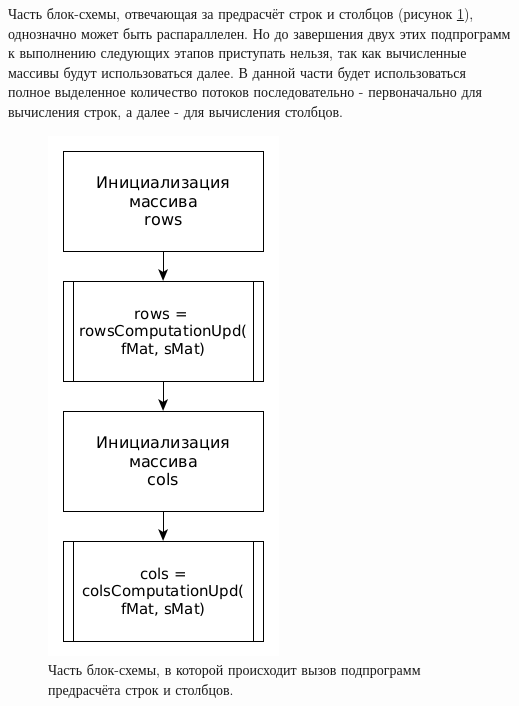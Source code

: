 \documentclass[12pt]{report}
\begin{document}
Часть блок-схемы, отвечающая за предрасчёт строк и столбцов (рисунок \ref{img:paralPart1}), однозначно может быть распараллелен. Но до завершения двух этих подпрограмм к выполнению следующих этапов приступать нельзя, так как вычисленные массивы будут использоваться далее. В данной части будет использоваться полное выделенное количество потоков последовательно - первоначально для вычисления строк, а далее - для вычисления столбцов.
\begin{figure}
\begin{center}
\includegraphics[scale=0.4]{inc/img/paralPart1.png}
\captionsetup{justification=centering}
	\caption{Часть блок-схемы, в которой происходит вызов подпрограмм предрасчёта строк и столбцов.}
	\label{img:paralPart1}	
\end{center}
\end{figure}
\newpage
\end{document}
